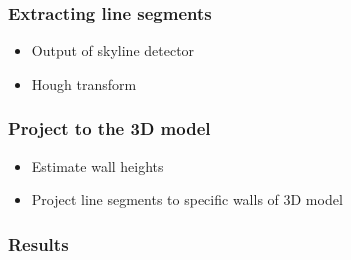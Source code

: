 \documentclass{beamer}
\begin{document}
\frame
{
	\frametitle{Extracting line segments}
	\begin{itemize}
	\item <+-| alert@+> Output of skyline detector
	\item <+-| alert@+> Hough transform
	\end{itemize}


}


\frame
{
	\frametitle{Project to the 3D model}
	\begin{itemize}
	\item <+-| alert@+> Estimate wall heights 
	\item <+-| alert@+> Project line segments to specific walls of 3D model
	\end{itemize}
}




\frame
{
	\frametitle{Results}
}
\end{document}
